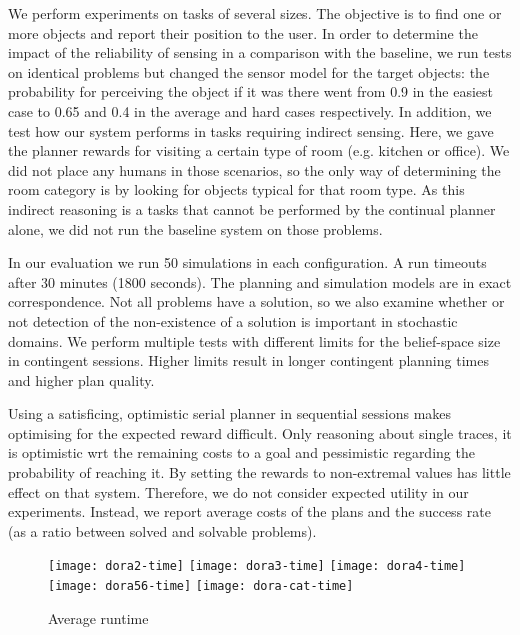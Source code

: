 
We perform experiments on tasks of several sizes. The objective is to
find one or more objects and report their position to the user. In
order to determine the impact of the reliability of sensing in a
comparison with the baseline, we run tests on identical problems but
changed the sensor model for the target objects: the probability for
perceiving the object if it was there went from 0.9 in the easiest
case to 0.65 and 0.4 in the average and hard cases respectively. In
addition, we test how our system performs in tasks requiring indirect
sensing. Here, we gave the planner rewards for visiting a certain type
of room (e.g. kitchen or office). We did not place any humans in those
scenarios, so the only way of determining the room category is by
looking for objects typical for that room type. As this indirect
reasoning is a tasks that cannot be performed by the continual planner
alone, we did not run the baseline system on those problems.



In our evaluation we run 50 simulations in each configuration. A run
timeouts after 30 minutes (1800 seconds). The planning and simulation
models are in exact correspondence. Not all problems have a solution,
so we also examine whether or not detection of the non-existence of a
solution is important in stochastic domains.
We perform multiple tests with different limits for the
belief-space size in contingent sessions.  Higher limits result in
longer contingent planning times and higher plan quality.


Using a satisficing, optimistic serial planner in sequential sessions
makes optimising for the expected reward difficult. Only reasoning
about single traces, it is optimistic wrt the remaining costs to a
goal and pessimistic regarding the probability of reaching it. By
setting the rewards to non-extremal values has little effect on that
system. Therefore, we do not consider expected utility in our
experiments. Instead, we report average costs of the plans and the
success rate (as a ratio between solved and solvable problems).

\begin{figure}[h!]
  \texttt{[image: dora2-time]}\hfill
  \texttt{[image: dora3-time]}\hfill
  \texttt{[image: dora4-time]}\hfill
  \vspace{2mm}
  \texttt{[image: dora56-time]}\hfill
  \vspace{2mm}
  \texttt{[image: dora-cat-time]}\hfill
  \caption{Average runtime}
  \label{fig:results-time}
\end{figure}

